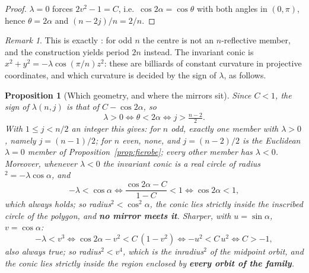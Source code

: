 \documentclass[11pt,a4paper]{article}
\theoremstyle{plain}
\newtheorem{proposition}[theorem]{Proposition}
\theoremstyle{definition}
\theoremstyle{remark}
\newtheorem{remark}[theorem]{Remark}
\begin{document}
\begin{proof}
$\lambda=0$ forces $2v^2-1=C$, i.e.\ $\cos2\alpha=\cos\theta$ with both angles in
$(0,\pi)$, hence $\theta=2\alpha$ and $(n-2j)/n=2/n$.
\end{proof}

\begin{remark}
This is exactly \cite[Prop.~1.5]{fie-ex}: for odd $n$ the centre is not an
$n$-reflective member, and the construction yields period $2n$ instead. The
invariant conic is $x^2+y^2=-\lambda\cos(\pi/n)z^2$: these are billiards of
constant curvature in projective coordinates, and which curvature is decided by
the sign of $\lambda$, as follows.
\end{remark}

\begin{proposition}[Which geometry, and where the mirrors sit]\label{prop:whichgeom}
Since $C<1$, the sign of $\lambda(n,j)$ is that of $C-\cos2\alpha$, so
\[
  \lambda>0\iff\theta<2\alpha\iff j>\tfrac{n-2}2 .
\]
With $1\le j<n/2$ an integer this gives: for $n$ odd, exactly one member with
$\lambda>0$, namely $j=(n-1)/2$; for $n$ even, none, and $j=(n-2)/2$ is the
Euclidean $\lambda=0$ member of Proposition~\ref{prop:fierobe}; every other member
has $\lambda<0$. Moreover, whenever $\lambda<0$ the invariant conic is a real
circle of radius$^2=-\lambda\cos\alpha$, and
\[
  -\lambda<\cos\alpha
  \iff\frac{\cos2\alpha-C}{1-C}<1
  \iff\cos2\alpha<1,
\]
which always holds; so radius$^2<\cos^2\alpha$, the conic lies strictly inside the
inscribed circle of the polygon, and \textbf{no mirror meets it}. Sharper, with
$u=\sin\alpha$, $v=\cos\alpha$:
\[
  -\lambda<v^3
  \iff \cos2\alpha-v^2<C\,(1-v^2)
  \iff -u^2<C\,u^2
  \iff C>-1,
\]
also always true; so radius$^2<v^4$, which is the inradius$^2$ of the midpoint
orbit, and the conic lies strictly inside the region enclosed by \textbf{every
orbit of the family}.
\end{proposition}
\end{document}
